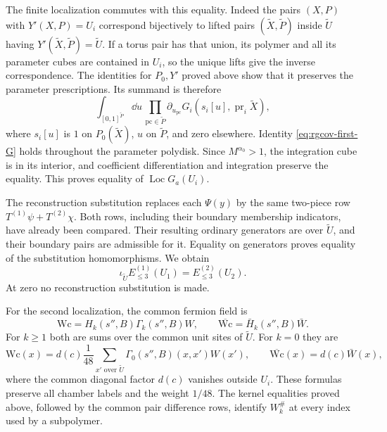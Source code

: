The finite localization commutes with this equality.
Indeed the pairs $(X,P)$ with $Y'(X,P)=U_i$ correspond
bijectively to lifted pairs $(\widetilde X,\widetilde P)$
inside $\widetilde U$ having
$Y'(\widetilde X,\widetilde P)=\widetilde U$.
If a torus pair has that union, its polymer and all
its parameter cubes are contained in $U_i$, so the
unique lifts give the inverse correspondence.
The identities for $P_0,Y'$ proved above show that
it preserves the parameter prescriptions.
Its summand is therefore
\begin{equation}\label{eq:rgcov-localization-term}
 \int_{[0,1]^{\widetilde P}}\dd u\,
       \prod_{\mathrm{pc}\in\widetilde P}\partial_{u_{\mathrm{pc}}}
                       G_i(s_i[u],\operatorname{pr}_i\widetilde X),
\end{equation}
where $s_i[u]$ is $1$ on $P_0(\widetilde X)$, $u$ on
$\widetilde P$, and zero elsewhere.
Identity \eqref{eq:rgcov-first-G} holds throughout
the parameter polydisk. Since $M^{\alpha_0}>1$,
the integration cube is in its interior, and
coefficient differentiation and integration preserve
the equality. This proves equality of
$\operatorname{Loc}G_a(U_i)$.

The reconstruction substitution replaces each $\Psi(y)$
by the same two-piece row $T^{(1)}\psi+T^{(2)}\chi$.
Both rows, including their boundary membership indicators,
have already been compared. Their resulting ordinary
generators are over $\widetilde U$, and their boundary
pairs are admissible for it. Equality on generators
proves equality of the substitution homomorphisms.
We obtain
\begin{equation}\label{eq:rgcov-first-localization}
              \iota_{\widetilde U}E_{\le3}^{(1)}(U_1)
                                      =E_{\le3}^{(2)}(U_2).
\end{equation}
At zero no reconstruction substitution is made.

For the second localization, the common fermion field is
\[
 \mathrm{Wc}=H_k(s'',B)\Gamma_k(s'',B)W,\qquad
 \overline{\mathrm{Wc}}=\bar H_k(s'',B)\bar W .
\]
For $k\ge1$ both are sums over the common unit sites
of $\widetilde U$. For $k=0$ they are
\[
 \mathrm{Wc}(x)=d(c)\frac1{48}
            \sum_{x'\text{ over }\widetilde U}
                                      \Gamma_0(s'',B)(x,x')W(x'),
 \qquad
 \overline{\mathrm{Wc}}(x)=d(c)\bar W(x),
\]
where the common diagonal factor $d(c)$ vanishes
outside $U_i$. These formulas preserve all chamber
labels and the weight $1/48$.
The kernel equalities proved above, followed by the
common pair difference rows, identify $W_k^\#$ at
every index used by a subpolymer.


